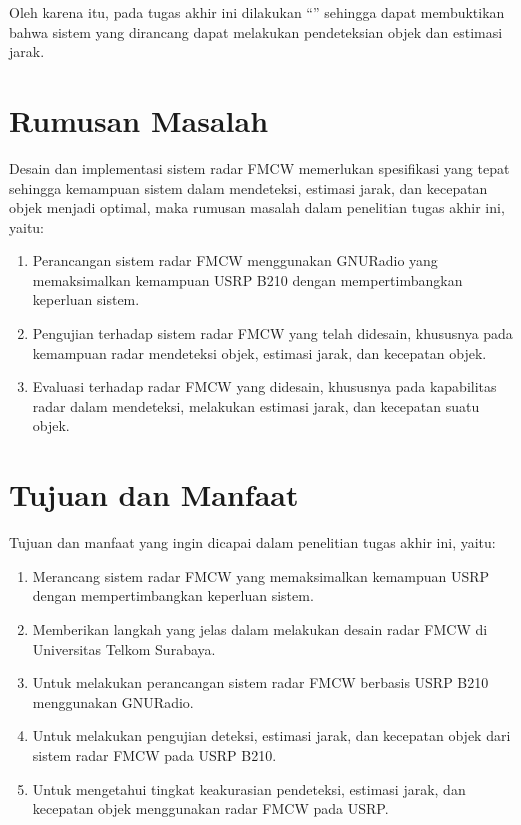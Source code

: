 Oleh karena itu, pada tugas akhir ini dilakukan “\judul” sehingga dapat membuktikan bahwa sistem yang dirancang dapat melakukan pendeteksian objek dan estimasi jarak.

\section{Rumusan Masalah}
Desain dan implementasi sistem radar FMCW memerlukan spesifikasi yang tepat sehingga kemampuan sistem dalam mendeteksi, estimasi jarak, dan kecepatan objek menjadi optimal, maka rumusan masalah dalam penelitian tugas akhir ini, yaitu:
\begin{enumerate}
	\item Perancangan sistem radar FMCW menggunakan GNURadio yang memaksimalkan kemampuan USRP B210 dengan mempertimbangkan keperluan sistem.
	\item Pengujian terhadap sistem radar FMCW yang telah didesain, khususnya pada kemampuan radar mendeteksi objek, estimasi jarak, dan kecepatan objek.
	\item Evaluasi terhadap radar FMCW yang didesain, khususnya pada kapabilitas radar dalam mendeteksi, melakukan estimasi jarak, dan kecepatan suatu objek.
\end{enumerate} 

\section{Tujuan dan Manfaat}
Tujuan dan manfaat yang ingin dicapai dalam penelitian tugas akhir ini, yaitu:

\begin{enumerate}
	\item Merancang sistem radar FMCW yang memaksimalkan kemampuan USRP dengan mempertimbangkan keperluan sistem.
	\item Memberikan langkah yang jelas dalam melakukan desain radar FMCW di Universitas Telkom Surabaya.
	\item Untuk melakukan perancangan sistem radar FMCW berbasis USRP B210 menggunakan GNURadio.
	\item Untuk melakukan pengujian deteksi, estimasi jarak, dan kecepatan objek dari sistem radar FMCW pada USRP B210.
	\item Untuk mengetahui tingkat keakurasian pendeteksi, estimasi jarak, dan kecepatan objek menggunakan radar FMCW pada USRP.
\end{enumerate}

